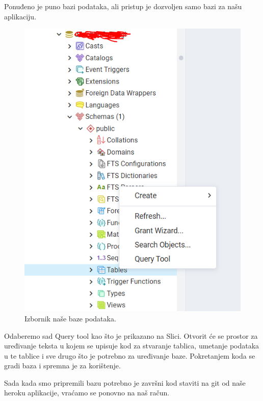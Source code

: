 			 Ponuđeno je puno bazi podataka, ali pristup je dozvoljen samo bazi za našu aplikaciju.
			  \begin{figure}[H]
			 	\includegraphics[scale=0.7]{slike/baza.png} 
			 	\centering
			 	\caption{ Izbornik naše baze podataka.}
			 	\label{BZZP}
			 \end{figure}
			 
			 Odaberemo sad Query tool kao što je prikazano na Slici. Otvorit će se prostor za uređivanje teksta u kojem se upisuje kod za stvaranje tablica, umetanje podataka u te tablice i sve drugo što je potrebno za uređivanje baze. Pokretanjem koda se gradi baza i spremna je za korištenje. 
			 
			 Sada kada smo pripremili bazu potrebno je završni kod staviti na git od naše heroku aplikacije, vraćamo se ponovno na naš račun.
			 
